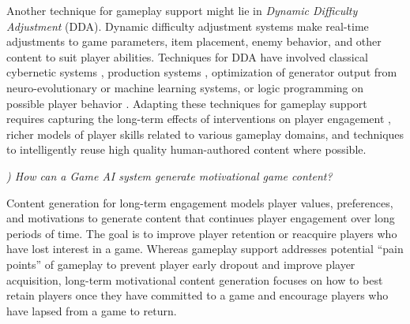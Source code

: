 \documentclass[conference]{IEEEtran}
\newcounter{questionno}
\newcommand{\subsubsectionx}[1]{{\em {\arabic{questionno}) #1}}
	\addtocounter{questionno}{1}
	}
\begin{document}
Another technique for gameplay support might lie in {\em Dynamic Difficulty Adjustment} (DDA).
Dynamic difficulty adjustment systems make real-time adjustments to game parameters, item placement, enemy behavior, and other content to suit player abilities.
Techniques for DDA have involved 
classical cybernetic systems \cite{hunicke2004:dda}, 
production systems \cite{magerko2006:isat}, %
optimization of generator output from neuro-evolutionary \cite{shaker2010:platformer-gen} 
or machine learning \cite{yu2011:minboredom} systems,
or logic programming on possible player behavior \cite{smith2012:refraction}. %
Adapting these techniques for gameplay support requires capturing the long-term effects of interventions on player engagement \cite{zook2012:tf}, richer models of player skills related to various gameplay domains, and techniques to intelligently reuse high quality human-authored content where possible.

\subsubsectionx{How can a Game AI system generate motivational game content?}
%
Content generation for long-term engagement models player values, preferences, and motivations to generate content that continues player engagement over long periods of time.
The goal is to improve player retention or reacquire players who have lost interest in a game.
Whereas gameplay support addresses potential ``pain points'' of gameplay to prevent player early dropout and improve player acquisition, long-term motivational content generation focuses on how to best retain players once they have committed to a game and encourage players who have lapsed from a game to return.
\end{document}
